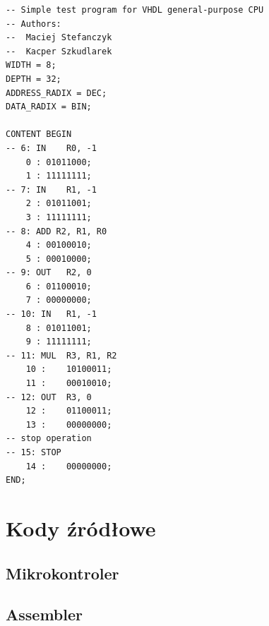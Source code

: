 \documentclass[a4paper,12pt]{report}
\begin{document}
\lstset{
tabsize=6
}
\begin{lstlisting}[caption=Plik wynikowy dla źródła z listingu~\ref{asm_1},language=ahdl]
-- Simple test program for VHDL general-purpose CPU
-- Authors:
-- 	Maciej Stefanczyk
--	Kacper Szkudlarek
WIDTH = 8;
DEPTH = 32;
ADDRESS_RADIX = DEC;
DATA_RADIX = BIN;

CONTENT BEGIN
-- 6: IN	R0, -1
	0 :	01011000;
	1 :	11111111;
-- 7: IN	R1, -1
	2 :	01011001;
	3 :	11111111;
-- 8: ADD R2, R1, R0
	4 :	00100010;
	5 :	00010000;
-- 9: OUT	R2, 0
	6 :	01100010;
	7 :	00000000;
-- 10: IN	R1, -1
	8 :	01011001;
	9 :	11111111;
-- 11: MUL	R3, R1, R2
	10 :	10100011;
	11 :	00010010;
-- 12: OUT	R3, 0
	12 :	01100011;
	13 :	00000000;
-- stop operation
-- 15: STOP
	14 :	00000000;
END;
\end{lstlisting}
\lstset{
tabsize=4
}

\chapter{Kody źródłowe}

\section{Mikrokontroler}









\section{Assembler}

\end{document}
